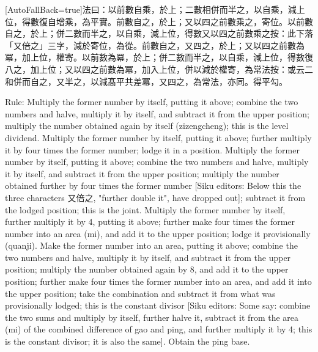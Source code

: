 \documentclass[11pt]{article}
\newcommand{\zhsmall}{\footnotesize\color{black!70}}
\newcommand{\unitlabel}[1]{\marginpar{\raggedleft\tiny\color{gray}#1}}
\newenvironment{unitzh}{\par\CJKfontspec{Noto Serif CJK SC}[AutoFallBack=true]\large\linespread{1.25}\selectfont}{\par}
\newenvironment{uniten}{\par\small\color{black!85}}{\par\medskip}
\begin{document}
\begin{unitzh}\unitlabel{ceyuan-024.27}法曰：以前數自乘，於上；二數相併而半之，以自乘，減上位，得數復自增乘，為平實。前數自之，於上；又以四之前數乘之，寄位。以前數自之，於上；併二數而半之，以自乘，減上位，得數又以四之前數乘之{\zhsmall 按：此下落「又倍之」三字}，減於寄位，為從。前數自之，又四之，於上；又以四之前數為冪，加上位，權寄。以前數為冪，於上；併二數而半之，以自乘，減上位，得數復八之，加上位；又以四之前數為冪，加入上位，併以減於權寄，為常法{\zhsmall 按：或云二和併而自之，又半之，以減髙平共差冪，又四之，為常法，亦同}。得平勾。\end{unitzh}
\begin{uniten}Rule: Multiply the former number by itself, putting it above; combine the two numbers and halve, multiply it by itself, and subtract it from the upper position; multiply the number obtained again by itself (zizengcheng); this is the level dividend. Multiply the former number by itself, putting it above; further multiply it by four times the former number; lodge it in a position. Multiply the former number by itself, putting it above; combine the two numbers and halve, multiply it by itself, and subtract it from the upper position; multiply the number obtained further by four times the former number [Siku editors: Below this the three characters 又倍之, "further double it", have dropped out]; subtract it from the lodged position; this is the joint. Multiply the former number by itself, further multiply it by 4, putting it above; further make four times the former number into an area (mi), and add it to the upper position; lodge it provisionally (quanji). Make the former number into an area, putting it above; combine the two numbers and halve, multiply it by itself, and subtract it from the upper position; multiply the number obtained again by 8, and add it to the upper position; further make four times the former number into an area, and add it into the upper position; take the combination and subtract it from what was provisionally lodged; this is the constant divisor [Siku editors: Some say: combine the two sums and multiply by itself, further halve it, subtract it from the area (mi) of the combined difference of gao and ping, and further multiply it by 4; this is the constant divisor; it is also the same]. Obtain the ping base.\end{uniten}
\end{document}
